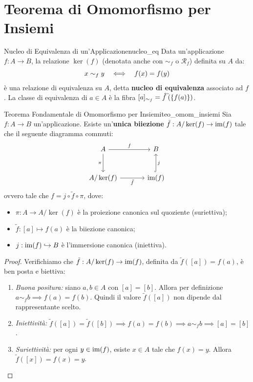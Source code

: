 \section{Teorema di Omomorfismo per Insiemi}

\begin{definizione}{Nucleo di Equivalenza di un'Applicazione}{nucleo_eq}
Data un'applicazione $f: A \to B$, la relazione $\ker(f)$ (denotata anche con $\sim_f$ o $\mathcal{R}_f$) definita su $A$ da:
\[
    x \sim_f y \quad \Longleftrightarrow \quad f(x) = f(y)
\]
è una relazione di equivalenza su $A$, detta \textbf{nucleo di equivalenza} associato ad $f$.
La classe di equivalenza di $a \in A$ è la fibra $[a]_{\sim_f} = \antivecf(\{f(a)\})$.
\end{definizione}

\begin{teorema}{Teorema Fondamentale di Omomorfismo per Insiemi}{teo_omom_insiemi}
Sia $f: A \to B$ un'applicazione. Esiste un'\textbf{unica biiezione} $\tilde{f}: A/\ker(f) \to \operatorname{im}(f)$ tale che il seguente diagramma commuti:
\[
\begin{tikzcd}[row sep=large, column sep=large]
A \arrow[r, "f"] \arrow[d, "\pi", swap] & B \\
A/\ker(f) \arrow[r, "\tilde{f}", swap] & \im(f) \arrow[u, "j", swap, hook]
\end{tikzcd}
\]
ovvero tale che $f = j \circ \tilde{f} \circ \pi$, dove:
\begin{itemize}
    \item $\pi: A \to A/\ker(f)$ è la proiezione canonica sul quoziente (suriettiva);
    \item $\tilde{f}: [a] \mapsto f(a)$ è la biiezione canonica;
    \item $j: \operatorname{im}(f) \hookrightarrow B$ è l'immersione canonica (iniettiva).
\end{itemize}
\end{teorema}

\begin{proof}
Verifichiamo che $\tilde{f}: A/\ker(f) \to \operatorname{im}(f)$, definita da $\tilde{f}([a]) = f(a)$, è ben posta e biettiva:
\begin{enumerate}
    \item \emph{Buona positura:} siano $a, b \in A$ con $[a] = [b]$. Allora per definizione $a \sim_f b \implies f(a) = f(b)$. Quindi il valore $\tilde{f}([a])$ non dipende dal rappresentante scelto.
    \item \emph{Iniettività:} $\tilde{f}([a]) = \tilde{f}([b]) \implies f(a) = f(b) \implies a \sim_f b \implies [a] = [b]$.
    \item \emph{Suriettività:} per ogni $y \in \operatorname{im}(f)$, esiste $x \in A$ tale che $f(x) = y$. Allora $\tilde{f}([x]) = f(x) = y$.
\end{enumerate}
\end{proof}

